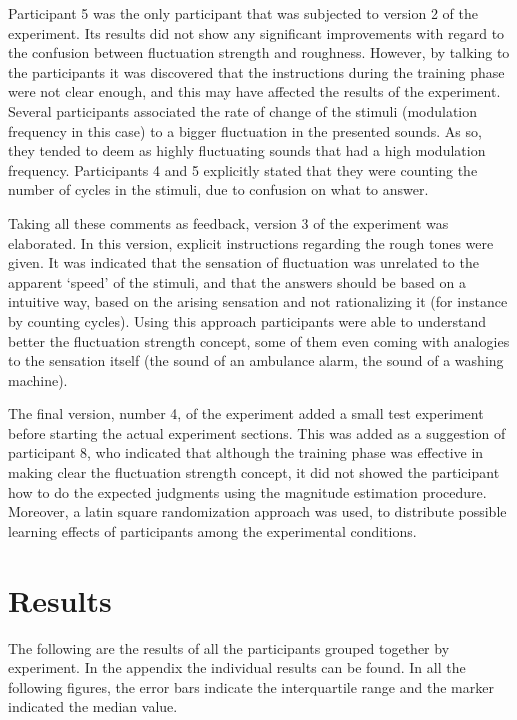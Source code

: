 \documentclass[a4paper]{article}
\begin{document}
Participant 5 was the only participant that was subjected to version 2 of the
experiment. Its results did not show any significant improvements with regard
to the confusion between fluctuation strength and roughness. However, by talking
to the participants it was discovered that the instructions during the training
phase were not clear enough, and this may have affected the results of the
experiment. Several participants associated the rate of change of the stimuli
(modulation frequency in this case) to a bigger fluctuation in the presented
sounds. As so, they tended to deem as highly fluctuating sounds that had a high
modulation frequency. Participants 4 and 5 explicitly stated that they were
counting the number of cycles in the stimuli, due to confusion on what to
answer.

Taking all these comments as feedback, version 3 of the experiment was
elaborated. In this version, explicit instructions regarding the rough tones
were given. It was indicated that the sensation of fluctuation was unrelated to
the apparent `speed' of the stimuli, and that the answers should be based on a
intuitive way, based on the arising sensation and not rationalizing it (for
instance by counting cycles). Using this approach participants were able to
understand better the fluctuation strength concept, some of them even coming
with analogies to the sensation itself (the sound of an ambulance alarm, the
sound of a washing machine).

The final version, number 4, of the experiment added a small test experiment
before starting the actual experiment sections. This was added as a suggestion
of participant 8, who indicated that although the training phase was effective
in making clear the fluctuation strength concept, it did not showed the
participant how to do the expected judgments using the magnitude estimation
procedure. Moreover, a latin square randomization approach was used, to
distribute possible learning effects of participants among the experimental
conditions.


\section{Results} %
\label{sec:results}

The following are the results of all the participants grouped together by
experiment. In the appendix the individual results can be found. In all the
following figures, the error bars indicate the interquartile range and the
marker indicated the median value.
\end{document}
